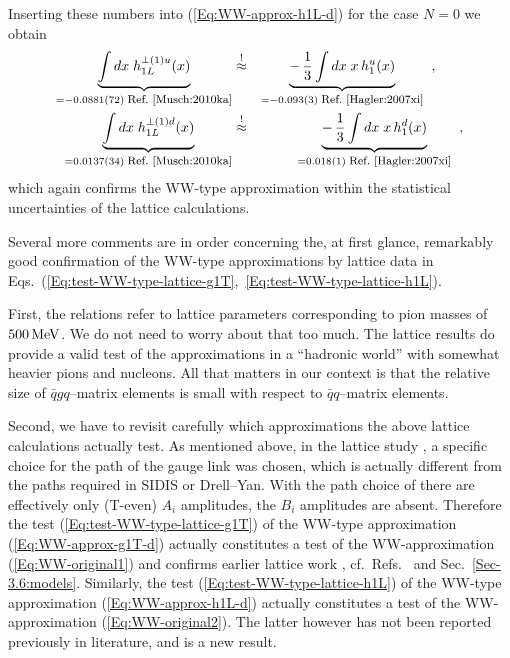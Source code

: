 \documentclass[a4paper,11pt]{article}
\newcommand{\ba}{\begin{eqnarray}}
\newcommand{\ea}{\end{eqnarray}}
\begin{document}
Inserting these numbers into  (\ref{Eq:WW-approx-h1L-d}) for the case
$N=0$ we obtain
\ba
        \underbrace{\int d x\;h_{1L}^{\perp(1)u}(x)}
        _{= -0.0881(72)\;\mbox{\footnotesize Ref.~\cite{Musch:2010ka}}}
        &\stackrel{!}{\approx}&
        \underbrace{-\,\frac{1}{3}\int d x\;x\,h_1^u(x)}
        _{= -0.093(3) \;\mbox{\footnotesize Ref.~\cite{Hagler:2007xi}}}
        \hspace{2mm} , \hspace{7mm} \nonumber \\
        \underbrace{\int d x\;h_{1L}^{\perp(1)d}(x)}
        _{= 0.0137(34) \;\mbox{\footnotesize Ref.~\cite{Musch:2010ka}}}
        &\stackrel{!}{\approx}&
        \underbrace{-\,\frac{1}{3}\int d x\;x\,h_1^d(x)}
        _{= 0.018(1) \;\mbox{\footnotesize Ref.~\cite{Hagler:2007xi}}}
        \hspace{2mm},
        \label{Eq:test-WW-type-lattice-h1L}
\ea
which again confirms the WW-type approximation within the statistical
uncertainties of the lattice calculations.

Several more comments are in order concerning the, at first glance, remarkably
good confirmation of the  WW-type approximations by lattice data in
Eqs.~(\ref{Eq:test-WW-type-lattice-g1T},~\ref{Eq:test-WW-type-lattice-h1L}).

First, the relations refer to lattice parameters corresponding
to pion masses of $500\,{\rm MeV}$. We do not
need to worry about that too much. The lattice results do provide
a valid test of the approximations in a ``hadronic world'' with
somewhat heavier pions and nucleons. All that matters in our
context is that the relative size of $\bar{q}gq$--matrix elements
is small with respect to $\bar{q}q$--matrix elements.

Second, we have to revisit carefully which approximations the above
lattice calculations actually test. As mentioned above, in
the lattice study \cite{Hagler:2009mb,Musch:2010ka}, a specific choice for
the path of the gauge link was chosen, which is actually different
from the paths required in SIDIS or Drell--Yan. With the path choice of
\cite{Hagler:2009mb,Musch:2010ka} there are effectively only (T-even)
$A_i$ amplitudes, the $B_i$ amplitudes are absent.
Therefore the test (\ref{Eq:test-WW-type-lattice-g1T}) of the WW-type
approximation (\ref{Eq:WW-approx-g1T-d}) actually constitutes a test
of the WW-approximation (\ref{Eq:WW-original1}) and confirms
earlier lattice work \cite{Gockeler:2000ja,Gockeler:2005vw},
cf.\ Refs.~\cite{Metz:2008ib,Teckentrup:2009tk} and
Sec.~\ref{Sec-3.6:models}.
Similarly, the test (\ref{Eq:test-WW-type-lattice-h1L}) of the
WW-type approximation (\ref{Eq:WW-approx-h1L-d}) actually constitutes
a test of the WW-approximation (\ref{Eq:WW-original2}). The latter
however has not been reported previously in literature, and is a
new result.
\end{document}

